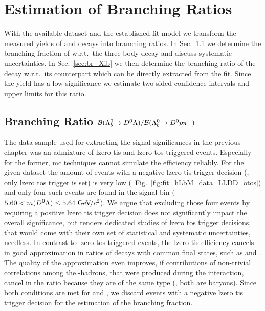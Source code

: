 \chapter{Estimation of Branching Ratios}
\label{chap:br}
With the available dataset and the established fit model we transform the measured yields of \decay{\Lb}{\Dz\Lz} and \decay{\Xibz}{\Dz\Lz} decays into branching ratios.
In Sec.~\ref{sec:br_Lb} we determine the branching fraction of \decay{\Lb}{\Dz\Lz} w.r.t.\ the three-body decay \decay{\Lb}{\Dz\proton\pim} and discuss systematic uncertainties.
In Sec.~\ref{sec:br_Xib} we then determine the branching ratio of the \Xibz decay w.r.t.\ its \Lb counterpart which can be directly extracted from the fit.
Since the \Xibz yield has a low significance we estimate two-sided confidence intervals and upper limits for this ratio.

\section{Branching Ratio \texorpdfstring{${\mathcal{B}}({{\Lambda}^0_{b}}\!\rightarrow {\ensuremath{{D}^0}}{\ensuremath{\Lambda}}) / {\mathcal{B}}({{\Lambda}^0_{b}}\!\rightarrow {\ensuremath{{D}^0}}{\ensuremath{p}}{\ensuremath{{\pi}^-}})$}{B(Λb → DΛ) / B(Λb → Dpπ)}}
\label{sec:br_Lb}
The data sample used for extracting the signal significances in the previous chapter was an admixture of \gls{lzero} \gls{tis} and \gls{lzero} \gls{tos} triggered events.
Especially for the former, \gls{mc} techniques cannot simulate the efficiency reliably.
For the given dataset the amount of events with a negative \gls{lzero} \gls{tis} trigger decision (\ie{}, only \gls{lzero} \gls{tos} trigger is set) is very low (\cf{}~Fig.~\ref{fig:fit_hLbM_data_LLDD_otos}) and only four such events are found in the signal bin ($5.60 < m({{D}^0}{\Lambda}) \le 5.64\,{\mathrm{\,Ge\kern -0.1em V\!/}c^2}$).
We argue that excluding those four events by requiring a positive \gls{lzero} \gls{tis} trigger decision does not significantly impact the overall significance, but renders dedicated studies of \gls{lzero} \gls{tos} trigger decisions, that would come with their own set of statistical and systematic uncertainties, needless. 
In contrast to \gls{lzero} \gls{tos} triggered events, the \gls{lzero} \gls{tis} efficiency cancels in good approximation in ratios of decays with common final states, such as \decay{\Lb}{\Dz\Lz} and \decay{\Lb}{\Dz\proton\pim}.
The quality of the approximation even improves, if contributions of non-trivial correlations among the \bquark-hadrons, that were produced during the \proton\proton interaction, cancel in the ratio because they are of the same type (\eg{}, both are \Lb baryons).
Since both conditions are met for \decay{\Lb}{\Dz\Lz} and \decay{\Lb}{\Dz\proton\pim}, we discard events with a negative \gls{lzero} \gls{tis} trigger decision for the estimation of the branching fraction.

